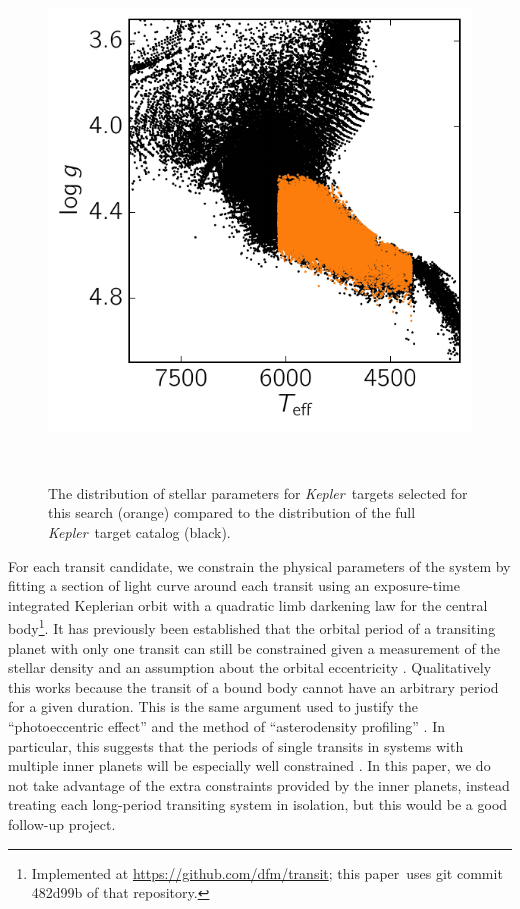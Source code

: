 \documentclass[manuscript, letterpaper]{aastex6}
\makeatletter
\let\origsubsection\subsection
\renewcommand\subsection{\@ifstar{\starsubsection}{\nostarsubsection}}
\newcommand\nostarsubsection[1]{\subsectionprelude\origsubsection{#1}}
\newcommand\starsubsection[1]{\subsectionprelude\origsubsection*{#1}}
\newcommand\subsectionprelude{\vspace{1em}}
\newcommand{\project}[1]{\textsl{#1}}
\newcommand{\kepler}{\project{Kepler}}
\newcommand{\dfmfiglabel}[1]{\label{fig:#1}}
\newcommand{\paper}{paper}
\makeatother
\begin{document}
\begin{figure}~\\
\begin{center}
\includegraphics{figures/targets.pdf}
\end{center}
\caption{%
The distribution of stellar parameters for \kepler\ targets selected for this
search (orange) compared to the distribution of the full \kepler\ target
catalog (black).
\dfmfiglabel{targets}}~\\
\end{figure}


\subsection{Parameter estimation}

For each transit candidate, we constrain the physical parameters of the system
by fitting a section of light curve around each transit using an exposure-time
integrated  Keplerian orbit with a quadratic limb darkening law for the
central body\footnote{Implemented at \url{https://github.com/dfm/transit};
this \paper\ uses git commit \textsf{482d99b} of that repository.}.
It has previously been established that the orbital period of a transiting
planet with only one transit can still be constrained given a measurement of
the stellar density and an assumption about the orbital eccentricity \cite[for
example][]{Wang:2015, Osborn:2016}.
Qualitatively this works because the transit of a bound body cannot have an
arbitrary period for a given duration.
This is the same argument used to justify the ``photoeccentric effect''
\citep{Dawson:2012} and the method of ``asterodensity profiling''
\citep{Kipping:2014b}.
In particular, this suggests that the periods of single transits in systems
with multiple inner planets will be especially well constrained
\citep{Kipping:2012}.
In this \paper, we do not take advantage of the extra constraints provided by
the inner planets, instead treating each long-period transiting system in
isolation, but this would be a good follow-up project.
\end{document}
